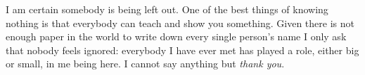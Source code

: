     I am certain somebody is being left out. One of the best things of knowing nothing is that everybody can teach and show you something. Given there is not enough paper in the world to write down every single person's name I only ask that nobody feels ignored: everybody I have ever met has played a role, either big or small, in me being here. I cannot say anything but \textit{thank you}.\\
